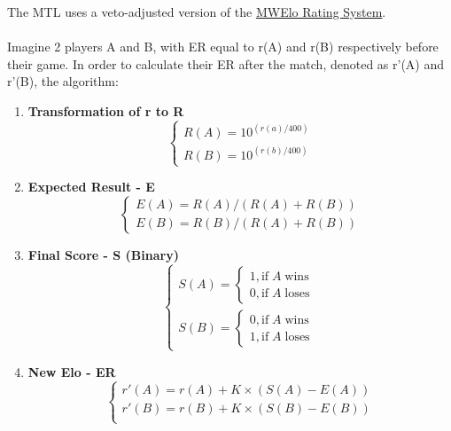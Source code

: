 The MTL uses a veto-adjusted version of the \href{https://www.warzone.com/Forum/216823-multiday-ladder?Offset=628}{MWElo Rating System}.
\\
\\
Imagine 2 players A and B, with ER equal to r(A) and r(B) respectively before their game. In order to calculate their ER after the match, denoted as r'(A) and r'(B), the algorithm:
\begin{enumerate}
    \item \textbf{Transformation of r to R} $$ \begin{cases}
        R(A) = 10^{(r(a)/400)} \\ 
        R(B) = 10^{(r(b)/400)}
    \end{cases} $$
    \item \textbf{Expected Result - E} $$
    \begin{cases}
        E(A) = R(A)/(R(A)+R(B)) \\
        E(B) = R(B)/(R(A)+R(B))
    \end{cases} $$
    \item \textbf{Final Score - S (Binary)} $$ 
    \begin{cases}
        S(A) = \begin{cases}
            1, \text{if} \; A \; \text{wins} \\
            0, \text{if} \; A \; \text{loses}
        \end{cases} \\
        S(B) = \begin{cases}
            0, \text{if} \; A \; \text{wins} \\
            1, \text{if} \; A \; \text{loses}
        \end{cases}
    \end{cases} $$
    \item \textbf{New Elo - ER} $$
    \begin{cases}
        r'(A) = r(A) + K \times (S(A)-E(A)) \\
        r'(B) = r(B) + K \times (S(B)-E(B)) \\
    \end{cases} $$
\end{enumerate}

